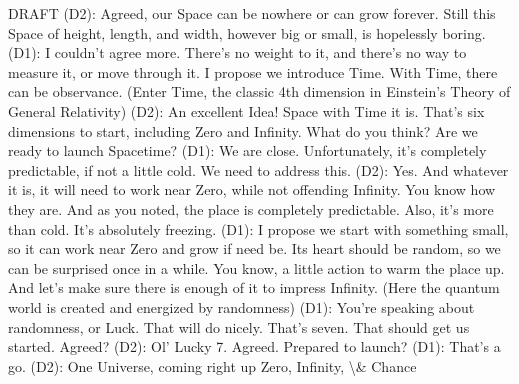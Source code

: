 \documentclass[12pt]{article}
\begin{document}
DRAFT
(D2): Agreed, our Space can be nowhere or can grow forever.
Still this Space of height, length, and width, however big or small, is hopelessly boring.
(D1): I couldn’t agree more. There’s no weight to it, and there’s no way to measure it,
or move through it. I propose we introduce Time. With Time, there can be observance.
(Enter Time, the classic 4th dimension in Einstein's Theory of General Relativity)
(D2): An excellent Idea! Space with Time it is. That’s six dimensions to start, including
Zero and Inﬁnity. What do you think? Are we ready to launch Spacetime?
(D1): We are close. Unfortunately, it’s completely predictable, if not a little cold. We
need to address this.
(D2): Yes. And whatever it is, it will need to work near Zero, while not oﬀending Inﬁnity.
You know how they are. And as you noted, the place is completely predictable. Also,
it’s more than cold. It’s absolutely freezing.
(D1): I propose we start with something small, so it can work near Zero and grow if
need be. Its heart should be random, so we can be surprised once in a while. You
know, a little action to warm the place up. And let’s make sure there is enough of it to
impress Inﬁnity. (Here the quantum world is created and energized by randomness)
(D1): You’re speaking about randomness, or Luck. That will do nicely. That’s seven.
That should get us started. Agreed?
(D2): Ol’ Lucky 7. Agreed. Prepared to launch?
(D1): That’s a go.
(D2): One Universe, coming right up
Zero, Infinity, \textbackslash{}& Chance
\end{document}
